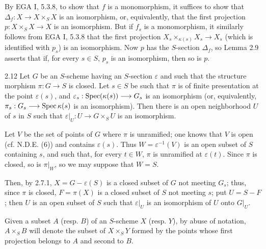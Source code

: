 By EGA I, 5.3.8, to show that $f$ is a monomorphism, it suffices to show that $\Delta_f:X\to X\times_SX$ is an isomorphism, or, equivalently, that the first projection $p:X\times_SX\to X$ is an isomorphism. But if $f_s$ is a monomorphism, it similarly follows from EGA I, 5.3.8 that the first projection $X_s\times_{\kappa(s)}X_s\to X_s$ (which is identified with $p_s$) is an isomorphism. Now $p$ has the $S$-section $\Delta_f$, so Lemma 2.9 asserts that if, for every $s\in S$, $p_s$ is an isomorphism, then so is $p$.
\begin{corollary}{2.12}\label{VIB.2.12}
Let $G$ be an $S$-scheme having an $S$-section $\varepsilon$ and such that the structure morphism $\pi:G\to S$ is closed. Let $s\in S$ be such that $\pi$ is of finite presentation at the point $\varepsilon(s)$, and $\varepsilon_s:\operatorname{Spec}(\kappa(s))\longrightarrow G_s$ is an isomorphism (or, equivalently, $\pi_s:G_s\longrightarrow\operatorname{Spec}\kappa(s)$ is an isomorphism). Then there is an open neighborhood $U$ of $s$ in $S$ such that $\varepsilon|_U:U\to G\times_SU$ is an isomorphism.
\end{corollary}
Let $V$ be the set of points of $G$ where $\pi$ is unramified; one knows that $V$ is open (cf. N.D.E. (6)) and contains $\varepsilon(s)$. Thus $W=\varepsilon^{-1}(V)$ is an open subset of $S$ containing $s$, and such that, for every $t\in W$, $\pi$ is unramified at $\varepsilon(t)$. Since $\pi$ is closed, so is $\pi|_W$, so we may suppose that $W=S$.

Then, by 2.7.1, $X=G-\varepsilon(S)$ is a closed subset of $G$ not meeting $G_s$; thus, since $\pi$ is closed, $F=\pi(X)$ is a closed subset of $S$ not meeting $s$; put $U=S-F$; then $U$ is an open subset of $S$ such that $\varepsilon|_U$ is an isomorphism of $U$ onto $G|_U$.

Given a subset $A$ (resp. $B$) of an $S$-scheme $X$ (resp. $Y$), by abuse of notation, $A\times_SB$ will denote the subset of $X\times_SY$ formed by the points whose first projection belongs to $A$ and second to $B$.
